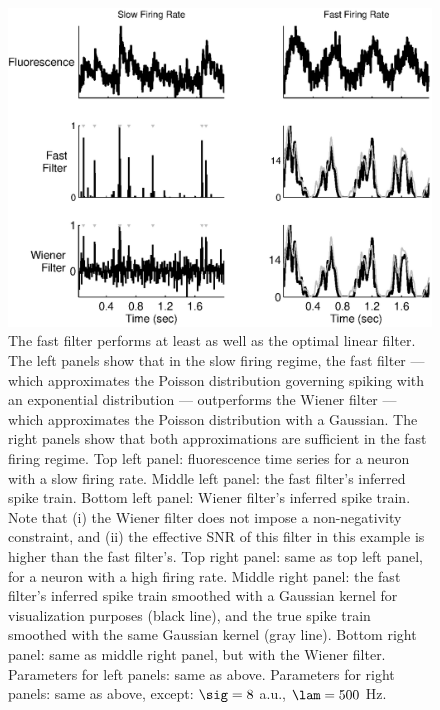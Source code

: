 \begin{figure}
\centering \includegraphics[width=.9\linewidth]{wiener}
\caption{The fast filter performs at least as well as the optimal linear filter. The left panels show that in the slow firing  regime, the fast filter --- which approximates the Poisson distribution governing spiking with an exponential distribution  --- outperforms the Wiener filter --- which approximates the Poisson distribution with a Gaussian.  The right panels show that both approximations are sufficient in the fast firing regime. Top left panel: fluorescence time series for a neuron with a slow firing rate.  Middle left panel: the fast filter's inferred spike train.  Bottom left panel: Wiener filter's inferred spike train.  Note that (i) the Wiener filter does not impose a non-negativity constraint, and (ii) the effective SNR of this filter in this example is higher than the fast filter's.  Top right panel: same as top left panel, for a neuron with a high firing rate.  Middle right panel: the fast filter's inferred spike train smoothed with a Gaussian kernel for visualization purposes (black line), and the true spike train smoothed with the same Gaussian kernel (gray line).  Bottom right panel: same as middle right panel, but with the Wiener filter. Parameters for left panels: same as above.  Parameters for right panels: same as above, except: $\sig=8$ a.u., $\lam=500$ Hz.} \label{fig:wiener}
\end{figure}

